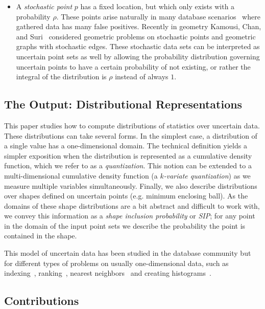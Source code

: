 \documentclass{journal}
\begin{document}
\begin{itemize}
\item 
A \emph{stochastic point} $p$ has a fixed location, but which only exists with a probability $\rho$.  These points arise naturally in many database scenarios~\cite{ABSHNSW06,CLY09} where gathered data has many false positives. Recently in geometry Kamousi, Chan, and Suri~\cite{KCS11a,KCS11b} considered geometric problems on stochastic points and geometric graphs with stochastic edges.  
These stochastic data sets can be interpreted as uncertain point sets as well by allowing the probability distribution governing uncertain points to have a certain probability of not existing, or rather the integral of the distribution is $\rho$ instead of always $1$.  

\end{itemize}


\subsection {The Output: Distributional Representations}

This paper studies how to compute distributions of statistics over uncertain data.  
These distributions can take several forms.  In the simplest case, a distribution of a single value has a one-dimensional domain.  
The technical definition yields a simpler exposition when the distribution is represented as a cumulative density function, which we refer to as a \emph{quantization}.  
This notion can be extended to a multi-dimensional cumulative density function (a \emph{$k$-variate quantization}) as we measure multiple variables simultaneously.  Finally, we also describe distributions over shapes defined on uncertain points (e.g. minimum enclosing ball).  As the domains of these shape distributions are a bit abstract and difficult to work with, we convey this information as a \emph{shape inclusion probability} or \emph{SIP}; for any point in the domain of the input point sets we describe the probability the point is contained in the shape.  

This model of uncertain data has been studied in the database community but for different types of problems on usually one-dimensional data, such as indexing~\cite{ACTY09,TCXNKP05,KMMH06}, ranking~\cite{CLY09}, nearest neighbors~\cite{CCMC08} and creating histograms~\cite{CG09}.


\subsection{Contributions}
\end{document}
